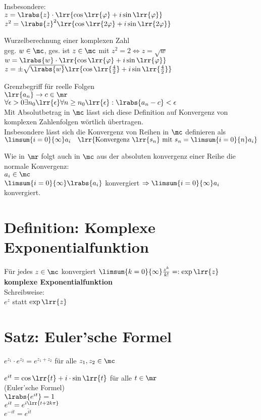 			Insbesondere:\\
			$z=\lrabs{z}\cdot\lrr{\cos\lrr{\varphi}+i\sin\lrr{\varphi}}$\\
			$z^2=\lrabs{z}^2\lrr{\cos\lrr{2\varphi}+i\sin\lrr{2\varphi}}$
		\item Wurzelberechnung einer komplexen Zahl\\
			geg. $w\in\mc$, ges. ist $z\in\mc$ mit $z^2=2\Leftrightarrow z=\sqrt{w}$\\
			$w=\lrabs{w}\cdot\lrr{\cos\lrr{\varphi}+i\sin\lrr{\varphi}}$\\
			$z=\pm\sqrt{\lrabs{w}}\lrr{\cos\lrr{\frac{4}{2}}+i\sin\lrr{\frac{4}{2}}}$

			Grenzbegriff für reelle Folgen\\
			$\lrr{a_n}\rightarrow c\in\mr$\\
			$\forall\epsilon >0\exists n_0\lrr{\epsilon}\forall n\geq n_0\lrr{\epsilon}:\lrabs{a_n-c}<\epsilon$\\
			Mit Absolutbetrag in $\mc$ lässt sich diese Definition auf Konvergenz von komplexen Zahlenfolgen wörtlich übertragen.\\
			Insbesondere lässt sich die Konvergenz von Reihen in $\mc$ definieren als\\
			$\limsum{i=0}{\infty}a_i\quad\lrr{\mbox{Konvergenz } \lrr{s_n} \mbox{ mit } s_n=\limsum{i=0}{n}a_i}$

			Wie in $\mr$ folgt auch in $\mc$ aus der absoluten konvergenz einer Reihe die normale Konvergenz:\\
			$a_i\in\mc$\\
			$\limsum{i=0}{\infty}\lrabs{a_i}$ konvergiert $\Rightarrow \limsum{i=0}{\infty}a_i$ konvergiert.
	\subExEnd

\section{Definition: Komplexe Exponentialfunktion}
	Für jedes $z\in\mc$ konvergiert $\limsum{k=0}{\infty}\frac{z^k}{k!}=:\exp\lrr{z}$\\
	\textbf{komplexe Exponentialfunktion}\\
	Schreibweise:\\
	$e^z$ statt $\exp\lrr{z}$

\section{Satz: Euler'sche Formel}
		\item $e^{z_1}\cdot e^{z_2}=e^{z_1+z_2}$ für alle $z_1,z_2\in\mc$
		\item $e^{it}=\cos\lrr{t}+i\cdot\sin\lrr{t}$ für alle $t\in\mr$\\
			(Euler'sche Formel)\\
			$\lrabs{e^{it}}=1$\\
			$e^{it}=e^{i\lrr{t+2k\pi}}$\\
			$e^{-it}=\overline{e^{it}}$

